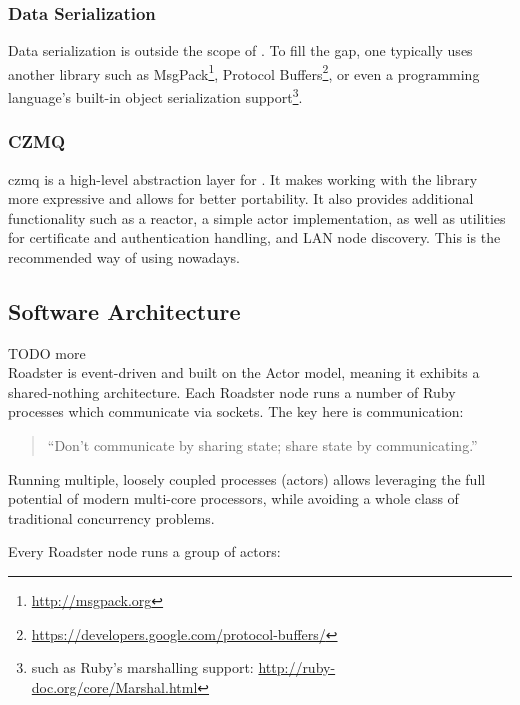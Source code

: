 \subsubsection{Data Serialization}
Data serialization is outside the scope of \zmq. To fill the gap, one typically
uses another library such as MsgPack\footnote{\url{http://msgpack.org}},
Protocol
Buffers\footnote{\url{https://developers.google.com/protocol-buffers/}}, or
even a programming language's built-in object serialization
support\footnote{such as Ruby's marshalling support:
\url{http://ruby-doc.org/core/Marshal.html}}.

\subsubsection{CZMQ}
\gls{czmq} is a high-level abstraction layer for \zmq. It makes working with the \zmq
library more expressive and allows for better portability. It also provides
additional functionality such as a reactor, a simple actor implementation, as
well as utilities for certificate and authentication handling, and LAN node
discovery. This is the recommended way of using \zmq nowadays.

\subsection{Software Architecture}
TODO more\\

Roadster is event-driven and built on the Actor model, meaning it exhibits a
shared-nothing architecture. Each Roadster node runs a number of Ruby processes
which communicate via \zmq sockets. The key here is communication:

\begin{quote}
``Don't communicate by sharing state; share state by communicating.''
\end{quote}

Running multiple, loosely coupled processes (actors) allows leveraging the full
potential of modern multi-core processors, while avoiding a whole class of
traditional concurrency problems.

Every Roadster node runs a group of actors:

